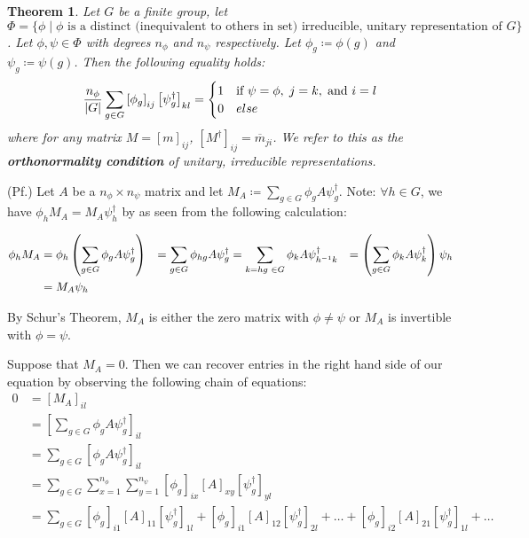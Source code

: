 \documentclass[10pt]{ucthesis}
\newtheorem{theorem}[definition]{Theorem}
\begin{document}
\begin{theorem}
	Let $G$ be a finite group, let $\Phi = \{\phi \mid \phi \text{ is a distinct (inequivalent to others in set) irreducible, unitary representation of }G\}$. Let $\phi,\psi \in \Phi$ with degrees $n_{\phi}$ and $n_{\psi}$ respectively. Let $\phi_g \coloneq \phi(g)$ and $\psi_g \coloneq \psi(g)$. Then the following equality holds:
$$\frac{n_\phi}{|G|} \sum_{g\in G} \left[\phi_g \right]_{ij} \left[\psi_g^\dag \right]_{kl} = \begin{cases}
																						1 & \text{if } \psi = \phi,\hspace{1mm} j=k,\hspace{1mm} \text{and } i=l\\
																						0 & else
																					 \end{cases}$$
where for any matrix $M=\left[m\right]_{ij}$, $\left[M^\dag\right]_{ij} = \overline{m}_{ji} $. We refer to this as the \textbf{orthonormality condition} of unitary, irreducible representations.
\end{theorem}

\noindent (Pf.) Let $A$ be a $n_\phi \times n_\psi$ matrix and let $M_A \coloneq \sum_{g\in G} \phi_{g} A \psi_g^{\dag}$. Note: $\forall h \in G$, we have $\phi_h M_A  = M_A \psi_h^\dag$ by as seen from the following calculation:

\begin{equation}
	\begin{aligned}
		\phi_h M_A &=  \phi_h \left(\sum_{g\in G} \phi_{g} A \psi_g^{\dag}\right) &= \sum_{g\in G} \phi_{hg} A \psi_g^{\dag} &= \sum_{k = hg \hspace{1mm} \in G} \phi_k A \psi_{h^{-1}k}^{\dag} &= \left(\sum_{g\in G} \phi_{k} A \psi_k^{\dag} \right)\psi_h \\ &= M_A\psi_h 
	\end{aligned}
\end{equation}

By Schur's Theorem, $M_A$ is either the zero matrix with $\phi \neq \psi$ or $M_A$ is invertible with $\phi=\psi$. 

Suppose that $M_A = 0$. Then we can recover entries in the right hand side of our equation by observing the following chain of equations:
\begin{equation}
	\begin{aligned}
		    0 &= \left[M_A\right]_{il} \\ 
			&= \left[\sum_{g\in G} \phi_{g} A \psi_g^{\dag}\right]_{il} \\
			&= \sum_{g\in G} \left[\phi_{g} A \psi_g^{\dag}\right]_{il} \\
			&= \sum_{g\in G} \sum_{x=1}^{n_\phi} \sum_{y=1}^{n_\psi}\left[\phi_{g}\right]_{ix} \left[A\right]_{xy} \left[\psi_g^{\dag}\right]_{yl} \\
			&= \sum_{g\in G} \left[\phi_{g}\right]_{i1} \left[A\right]_{11} \left[\psi_g^{\dag}\right]_{1l} + \left[\phi_{g}\right]_{i1} \left[A\right]_{12} \left[\psi_g^{\dag}\right]_{2l} + \hdots + \left[\phi_{g}\right]_{i2} \left[A\right]_{21} \left[\psi_g^{\dag}\right]_{1l} + \hdots
	\end{aligned}
\end{equation}
\end{document}
